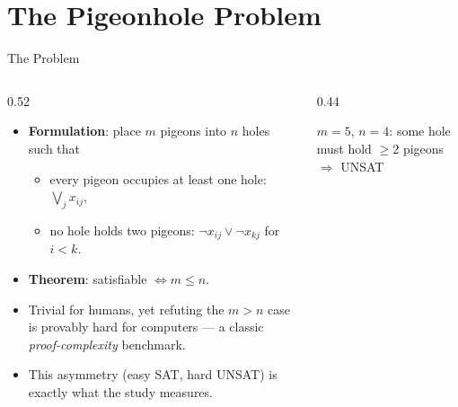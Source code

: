 \documentclass[10pt,aspectratio=169,xcolor={table}]{beamer}
\begin{document}
\section{The Pigeonhole Problem}

\begin{frame}{The Problem}
  \begin{columns}[T]
    \begin{column}{0.52\textwidth}
      \begin{itemize}\itemsep3pt
        \item \textbf{Formulation}: place $m$ pigeons into $n$
          holes such that
          \begin{itemize}
            \item every pigeon occupies at least one hole:
                  $\bigvee_j x_{ij}$,
            \item no hole holds two pigeons:
                  $\lnot x_{ij} \lor \lnot x_{kj}$ for $i<k$.
          \end{itemize}
        \item \textbf{Theorem}: satisfiable $\iff m \le n$.
        \item Trivial for humans, yet refuting the $m>n$ case is
          provably hard for computers --- a classic
          \emph{proof-complexity} benchmark.
        \item This asymmetry (easy SAT, hard UNSAT) is exactly
          what the study measures.
      \end{itemize}
    \end{column}
    \begin{column}{0.44\textwidth}
      \centering

      \medskip
      {\scriptsize $m=5$, $n=4$: some hole must hold
       $\ge 2$ pigeons $\Rightarrow$ UNSAT}
    \end{column}
  \end{columns}
\end{frame}
\end{document}
